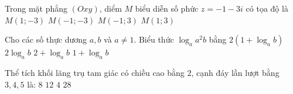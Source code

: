 \begin{ex}%
Trong mặt phẳng $(O x y)$, diểm $M$ biểu diễn số phức $z=-1-3 i$ có tọa độ là
\choice
{$M(1;-3)$}
{\True $M(-1;-3)$}
{$M(-1; 3)$}
{$M(1; 3)$}

\end{ex}
\begin{ex}%
Cho các số thực dương $a, b$ và $a \neq 1$. Biểu thức $\log_a a^2 b$ bằng
\choice
{$2\left(1+\log_a b\right)$}
{$2\log_a b$}
{\True $2+\log_a b$}
{$1+\log_a b$}

\end{ex}
\begin{ex}%
Thể tích khối lăng trụ tam giác có chiều cao bằng $2$, cạnh đáy lần lượt bằng $3,4,5$ là:
\choice
{$8$}
{\True $12$}
{$4$}
{$28$}

\end{ex}

